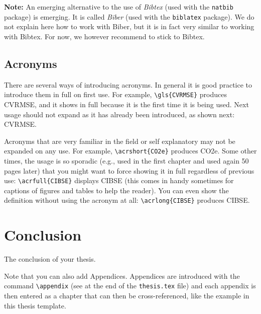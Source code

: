 \documentclass[11pt,twoside,openright]{report}
\begin{document}
\textbf{Note:} An emerging alternative to the use of \emph{Bibtex} (used with the \verb|natbib| package) is emerging.
It is called \emph{Biber} (used with the \verb|biblatex| package).
We do not explain here how to work with Biber, but it is in fact very similar to working with Bibtex. 
For now, we however recommend to stick to Bibtex.



\section{Acronyms}
\label{sec:Acronyms}

There are several ways of introducing acronyms. 
In general it is good practice to introduce them in full on first use. 
For example, \verb|\gls{CVRMSE}| produces \gls{CVRMSE}, and it shows in full because 
it is the first time it is being used.
Next usage should not expand as it has already been introduced, as shown next: \gls{CVRMSE}.

Acronyms that are very familiar in the field or self explanatory may not be expanded on any use.
For example, \verb|\acrshort{CO2e}| produces \acrshort{CO2e}.
Some other times, the usage is so sporadic 
(e.g., used in the first chapter and used again 50 pages later)
that you might want to force showing it in full regardless of previous use: 
\verb|\acrfull{CIBSE}| displays \acrfull{CIBSE}
(this comes in handy sometimes for captions of figures and tables to help the reader).
You can even show the definition without using the acronym at all: 
\verb|\acrlong{CIBSE}| produces \acrlong{CIBSE}.


\chapter{Conclusion}
\label{ch:conclusion}

The conclusion of your thesis.

Note that you can also add Appendices. 
Appendices are introduced with the command \verb|\appendix| (see at the end of the \verb|thesis.tex| file) and each appendix is then entered as a chapter that can then be cross-referenced, like the example  in this thesis template.




\end{document}
